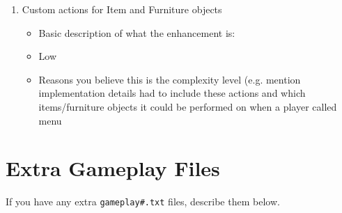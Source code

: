 \documentclass[11pt]{article}
\begin{document}
\begin{enumerate}
\item Custom actions for Item and Furniture objects
	\begin{itemize}
	\item Basic description of what the enhancement is:
	\item Low
	\item Reasons you believe this is the complexity level (e.g. mention implementation details
        had to include these actions and which items/furniture objects it could be performed on
        when a player called menu
	\end{itemize}


\end{enumerate}


\section*{Extra Gameplay Files}

If you have any extra \texttt{gameplay\#.txt} files, describe them below.
\end{document}
